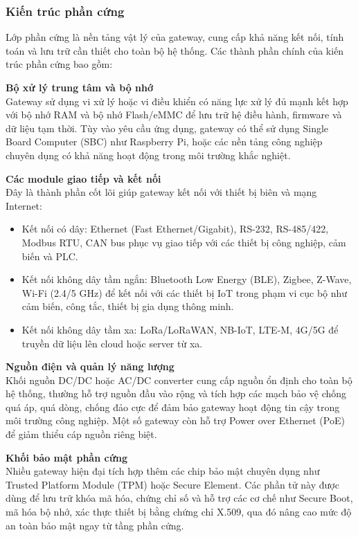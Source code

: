                 \subsubsection{Kiến trúc phần cứng}
                    Lớp phần cứng là nền tảng vật lý của gateway, cung cấp khả năng kết nối, tính toán và lưu trữ cần thiết cho toàn bộ hệ thống. Các thành phần chính của kiến trúc phần cứng bao gồm:

                    \textbf{Bộ xử lý trung tâm và bộ nhớ} \\
                        Gateway sử dụng vi xử lý hoặc vi điều khiển có năng lực xử lý đủ mạnh kết hợp với bộ nhớ RAM và bộ nhớ Flash/eMMC để lưu trữ hệ điều hành, firmware và dữ liệu tạm thời. Tùy vào yêu cầu ứng dụng, gateway có thể sử dụng Single Board Computer (SBC) như Raspberry Pi, hoặc các nền tảng công nghiệp chuyên dụng có khả năng hoạt động trong môi trường khắc nghiệt.

                    \textbf{Các module giao tiếp và kết nối} \\
                        Đây là thành phần cốt lõi giúp gateway kết nối với thiết bị biên và mạng Internet:
                        \begin{itemize}
                            \item Kết nối có dây: Ethernet (Fast Ethernet/Gigabit), RS-232, RS-485/422, Modbus RTU, CAN bus phục vụ giao tiếp với các thiết bị công nghiệp, cảm biến và PLC.
                            \item Kết nối không dây tầm ngắn: Bluetooth Low Energy (BLE), Zigbee, Z-Wave, Wi-Fi (2.4/5 GHz) để kết nối với các thiết bị IoT trong phạm vi cục bộ như cảm biến, công tắc, thiết bị gia dụng thông minh.
                            \item Kết nối không dây tầm xa: LoRa/LoRaWAN, NB-IoT, LTE-M, 4G/5G để truyền dữ liệu lên cloud hoặc server từ xa.
                        \end{itemize}

                    \textbf{Nguồn điện và quản lý năng lượng} \\
                        Khối nguồn DC/DC hoặc AC/DC converter cung cấp nguồn ổn định cho toàn bộ hệ thống, thường hỗ trợ nguồn đầu vào rộng và tích hợp các mạch bảo vệ chống quá áp, quá dòng, chống đảo cực để đảm bảo gateway hoạt động tin cậy trong môi trường công nghiệp. Một số gateway còn hỗ trợ Power over Ethernet (PoE) để giảm thiểu cáp nguồn riêng biệt.

                    \textbf{Khối bảo mật phần cứng}\\
                        Nhiều gateway hiện đại tích hợp thêm các chip bảo mật chuyên dụng như Trusted Platform Module (TPM) hoặc Secure Element. Các phần tử này được dùng để lưu trữ khóa mã hóa, chứng chỉ số và hỗ trợ các cơ chế như Secure Boot, mã hóa bộ nhớ, xác thực thiết bị bằng chứng chỉ X.509, qua đó nâng cao mức độ an toàn bảo mật ngay từ tầng phần cứng.

